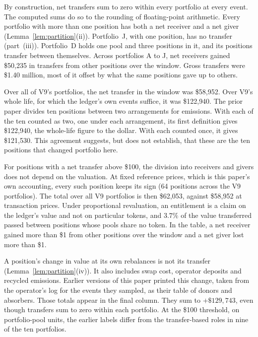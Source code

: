 \documentclass[11pt,a4paper]{article}
\theoremstyle{siphon}
\begin{document}
By construction, net transfers sum to zero within every portfolio at every event. The computed sums do so to the rounding of floating-point arithmetic. Every portfolio with more than one position has both a net receiver and a net giver (Lemma~\ref{lem:partition}(ii)). Portfolio~J, with one position, has no transfer (part~(iii)). Portfolio~D holds one pool and three positions in it, and its positions transfer between themselves. Across portfolios A to J, net receivers gained \$50{,}235 in transfers from other positions over the window. Gross transfers were \$1.40 million, most of it offset by what the same positions gave up to others.

Over all of V9's portfolios, the net transfer in the window was \$58{,}952. Over V9's whole life, for which the ledger's own events suffice, it was \$122{,}940. The prior paper divides ten positions between two arrangements for emissions. With each of the ten counted as two, one under each arrangement, its first definition gives \$122{,}940, the whole-life figure to the dollar. With each counted once, it gives \$121{,}530\cite{ryan2026siphon}. This agreement suggests, but does not establish, that these are the ten positions that changed portfolio here.

For positions with a net transfer above \$100, the division into receivers and givers does not depend on the valuation. At fixed reference prices, which is this paper's own accounting, every such position keeps its sign (64 positions across the V9 portfolios). The total over all V9 portfolios is then \$62{,}053, against \$58{,}952 at transaction prices. Under proportional revaluation, an entitlement is a claim on the ledger's value and not on particular tokens, and $3.7\%$ of the value transferred passed between positions whose pools share no token. In the table, a net receiver gained more than \$1 from other positions over the window and a net giver lost more than \$1.

A position's change in value at its own rebalances is not its transfer (Lemma~\ref{lem:partition}(iv)). It also includes swap cost, operator deposits and recycled emissions. Earlier versions of this paper printed this change, taken from the operator's log for the events they sampled, as their table of donors and absorbers. Those totals appear in the final column. They sum to $+\$129{,}743$, even though transfers sum to zero within each portfolio. At the \$100 threshold, on portfolio-pool units, the earlier labels differ from the transfer-based roles in nine of the ten portfolios.
\end{document}
